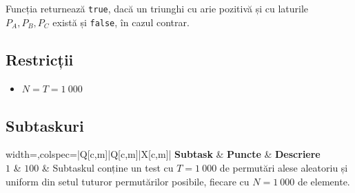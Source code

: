 \documentclass[12pt]{article}
\begin{document}

Funcția returnează \texttt{true}, dacă un triunghi cu arie pozitivă și cu laturile $P_A,P_B,P_C$ există și \texttt{false}, în cazul contrar.


\subsection{Restricții}
\vspace{0.1em}
\begin{itemize}
	\item $N = T = 1~000$
\end{itemize}


\subsection{Subtaskuri}
\begin{table}[H]
	\begin{tblr}{width=\linewidth,colspec={|Q[c,m]|Q[c,m]|X[c,m]|}}
		\hline
		\textbf{Subtask} & \textbf{Puncte} & \textbf{Descriere}\\
		\hline
		$1$ & $100$ & Subtaskul conține un test cu $T=1~000$ de permutări alese aleatoriu și uniform din setul tuturor permutărilor posibile, fiecare cu $N=1~000$ de elemente.  \\ 
		\hline
	\end{tblr}
	\caption*{Punctele pentru un anumit subtask se obțin numai dacă toate testele acestuia sunt trecute cu succes.}
\end{table}
\FloatBarrier
\end{document}
